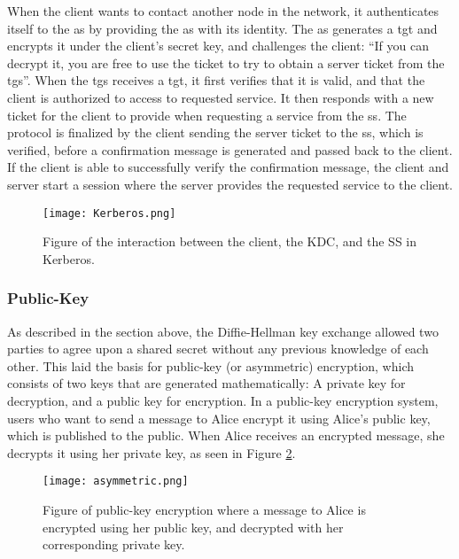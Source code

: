 When the client wants to contact another node in the network, it authenticates itself to the \gls{as} by providing the \gls{as} with its identity. The \gls{as} generates a \gls{tgt} and encrypts it under the client's secret key, and challenges the client: ``If you can decrypt it, you are free to use the ticket to try to obtain a server ticket from the \gls{tgs}''. When the \gls{tgs} receives a \gls{tgt}, it first verifies that it is valid, and that the client is authorized to access to requested service. It then responds with a new ticket for the client to provide when requesting a service from the \gls{ss}. The protocol is finalized by the client sending the server ticket to the \gls{ss}, which is verified, before a confirmation message is generated and passed back to the client. If the client is able to successfully verify the confirmation message, the client and server start a session where the server provides the requested service to the client.


\begin{figure}[h]
	\centering
	\texttt{[image: Kerberos.png]}
	\caption{Figure of the interaction between the client, the KDC, and the SS in Kerberos.}
	\label{fig:kerberos}
\end{figure}

\subsubsection{Public-Key}

As described in the section above, the Diffie-Hellman key exchange allowed two parties to agree upon a shared secret without any previous knowledge of each other. This laid the basis for public-key (or asymmetric) encryption, which consists of two keys that are generated mathematically: A private key for decryption, and a public key for encryption. In a public-key encryption system, users who want to send a message to Alice encrypt it using Alice's public key, which is published to the public. When Alice receives an encrypted message, she decrypts it using her private key, as seen in Figure \ref{fig:asymmetric}.


\begin{figure}[h]
	\centering
	\texttt{[image: asymmetric.png]}
	\caption{Figure of public-key encryption where a message to Alice is encrypted using her public key, and decrypted with her corresponding private key.}
	\label{fig:asymmetric}
\end{figure}

